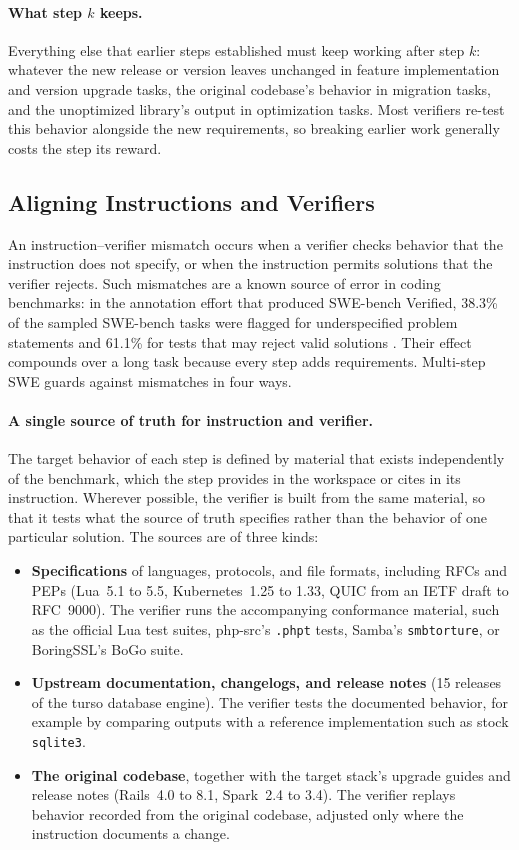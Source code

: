 \documentclass{article}
\newcommand{\bench}{Multi-step SWE\xspace}
\begin{document}
\paragraph{What step $k$ keeps.}
Everything else that earlier steps established must keep working after step
$k$: whatever the new release or version leaves unchanged in feature
implementation and version upgrade tasks, the original codebase's behavior in
migration tasks, and the unoptimized library's output in optimization tasks.
Most verifiers re-test this behavior alongside the
new requirements, so breaking earlier work generally
costs the step its reward.

\subsection{Aligning Instructions and Verifiers}
\label{sec:alignment}

An instruction--verifier mismatch occurs when a verifier checks behavior that
the instruction does not specify, or when the instruction permits solutions
that the verifier rejects. Such mismatches are a known source of error in
coding benchmarks: in the annotation effort that produced SWE-bench Verified,
38.3\% of the sampled SWE-bench tasks were flagged for underspecified problem
statements and 61.1\% for tests that may reject valid solutions
\citep{openai2024swebenchverified}. Their effect
compounds over a long task because every step adds requirements. \bench guards
against mismatches in four ways.

\paragraph{A single source of truth for instruction and verifier.}
The target behavior of each step is defined by material that exists
independently of the benchmark, which the step provides in the workspace or
cites in its instruction. Wherever
possible, the verifier is built from the same material, so that it tests what
the source of truth specifies rather than the behavior of one particular
solution. The sources are of three kinds:
\begin{itemize}
  \item \textbf{Specifications} of languages, protocols, and file formats,
    including RFCs and PEPs (Lua~5.1 to 5.5, Kubernetes~1.25 to 1.33, QUIC from
    an IETF draft to RFC~9000). The verifier runs the accompanying conformance
    material, such as the official Lua test suites, php-src's \texttt{.phpt}
    tests, Samba's \texttt{smbtorture}, or BoringSSL's BoGo suite.
  \item \textbf{Upstream documentation, changelogs, and release notes} (15
    releases of the turso database engine). The verifier tests the documented
    behavior, for example by comparing outputs with a reference implementation
    such as stock \texttt{sqlite3}.
  \item \textbf{The original codebase}, together with the target stack's
    upgrade guides and release notes (Rails~4.0 to 8.1, Spark~2.4 to 3.4). The
    verifier replays behavior recorded from the original codebase, adjusted
    only where the instruction documents a change.
\end{itemize}
\end{document}
